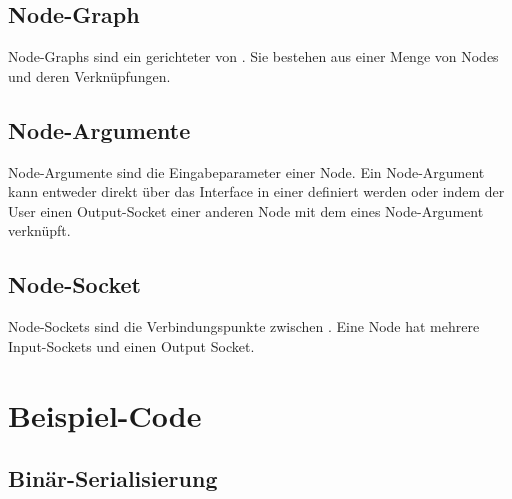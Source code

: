 \documentclass[ngerman]{article}
\begin{document}
\subsection{Node-Graph}
\label{sec:node_graph}
Node-Graphs sind ein gerichteter  von . Sie bestehen aus einer Menge von Nodes und deren Verknüpfungen. 

\subsection{Node-Argumente}
\label{sec:node_argumente}
Node-Argumente sind die Eingabeparameter einer Node. Ein Node-Argument kann entweder direkt über das Interface in einer  definiert werden oder indem der User einen Output-Socket einer anderen Node mit dem  eines Node-Argument verknüpft.

\subsection{Node-Socket}
\label{sec:node_socket}
Node-Sockets sind die Verbindungspunkte zwischen . Eine Node hat mehrere Input-Sockets und einen Output Socket.

\section{Beispiel-Code}

\subsection{Binär-Serialisierung}
\label{sec:code_nested_encoding}
\end{document}
